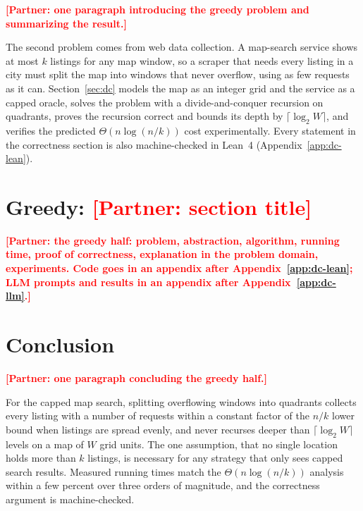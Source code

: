 \documentclass[conference]{IEEEtran}
\theoremstyle{spaced}
\newcommand{\partnertodo}[1]{\textcolor{red}{\textbf{[Partner: #1]}}}
\begin{document}
\partnertodo{one paragraph introducing the greedy problem and summarizing
the result.}

The second problem comes from web data collection. A map-search service
shows at most $k$ listings for any map window, so a scraper that needs every
listing in a city must split the map into windows that never overflow, using
as few requests as it can. Section~\ref{sec:dc} models the map as an integer
grid and the service as a capped oracle, solves the problem with a
divide-and-conquer recursion on quadrants, proves the recursion correct and
bounds its depth by $\lceil\log_2 W\rceil$, and verifies the predicted
$\Theta(n\log(n/k))$ cost experimentally. Every statement in the correctness
section is also machine-checked in Lean~4 (Appendix~\ref{app:dc-lean}).

\section{Greedy: \partnertodo{section title}}
\label{sec:greedy}

\partnertodo{the greedy half: problem, abstraction, algorithm, running time,
proof of correctness, explanation in the problem domain, experiments. Code
goes in an appendix after Appendix~\ref{app:dc-lean}; LLM prompts and results
in an appendix after Appendix~\ref{app:dc-llm}.}



\section{Conclusion}

\partnertodo{one paragraph concluding the greedy half.}

For the capped map search, splitting overflowing windows into quadrants
collects every listing with a number of requests within a constant factor of
the $n/k$ lower bound when listings are spread evenly, and never recurses
deeper than $\lceil\log_2 W\rceil$ levels on a map of $W$ grid units. The
one assumption, that no single location holds more than $k$ listings, is
necessary for any strategy that only sees capped search results. Measured
running times match the $\Theta(n\log(n/k))$ analysis within a few percent
over three orders of magnitude, and the correctness argument is
machine-checked.




\onecolumn
\appendices

\end{document}

